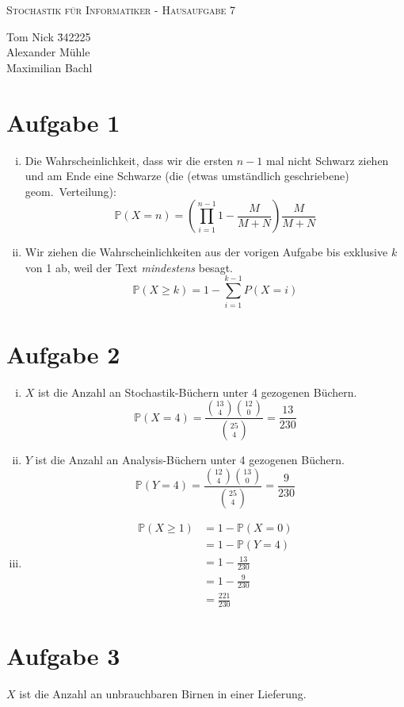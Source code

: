 \documentclass[10pt,a4paper,parskip=half]{scrartcl}
\begin{document}
\begin{center}
\textsc{\Large{Stochastik für Informatiker - Hausaufgabe 7}} \\
\end{center}
\begin{tabbing}
Tom Nick \hspace{1.4cm}\= 342225\\
Alexander Mühle\\
Maximilian Bachl
\end{tabbing}
\section*{Aufgabe 1}
\begin{enumerate}[(i)]
\item
Die Wahrscheinlichkeit, dass wir die ersten $n-1$ mal nicht Schwarz ziehen und am Ende eine Schwarze (die (etwas umständlich geschriebene) geom.~Verteilung):
$$\mathbb P(X = n) = \left(\prod_{i=1}^{n-1} 1-\frac{M}{M+N}\right) \frac{M}{M+N}$$
\item
Wir ziehen die Wahrscheinlichkeiten aus der vorigen Aufgabe bis exklusive $k$ von 1 ab, weil der Text \textit{mindestens} besagt.
$$ \mathbb P(X \ge k) = 1 - \sum_{i=1}^{k-1} P(X = i)$$
\end{enumerate}
\section*{Aufgabe 2}
\begin{enumerate}[(i)]
\item
$X$ ist die Anzahl an Stochastik-Büchern unter 4 gezogenen Büchern.
$$\mathbb P(X=4) = \frac{{13\choose 4} {12 \choose 0}}{{25 \choose 4}} = \frac{13}{230}$$
\item
$Y$ ist die Anzahl an Analysis-Büchern unter 4 gezogenen Büchern.
$$\mathbb P(Y=4) = \frac{{12\choose 4} {13 \choose 0}}{{25 \choose 4}} = \frac{9}{230}$$
\item
\begin{align*}
\mathbb P(X\ge 1) &= 1 - \mathbb P(X= 0)\\
&= 1 - \mathbb P(Y= 4)\\
&= 1 - \frac{13}{230}\\
&= 1 - \frac 9 {230}\\
&= \frac{221}{230}
\end{align*}
\end{enumerate}
\section*{Aufgabe 3}
$X$ ist die Anzahl an unbrauchbaren Birnen in einer Lieferung.
\end{document}
